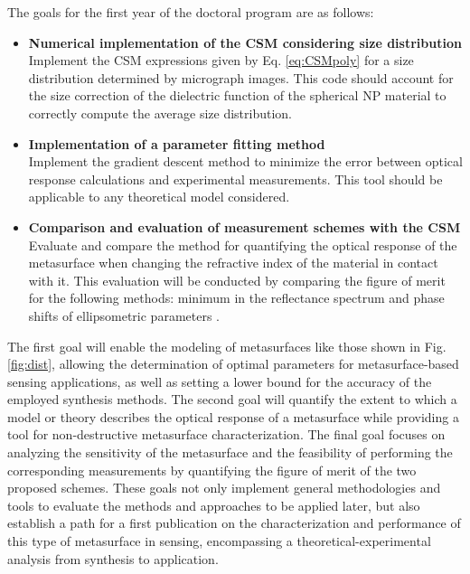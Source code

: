 The goals for the first year of the doctoral program are as follows:
%
\begin{itemize}
	\item \textbf{Numerical implementation of the CSM considering size distribution}\\
	Implement the CSM expressions given by Eq. \eqref{eq:CSMpoly} for a size distribution determined by micrograph images. This code should account for the size correction of the dielectric function \cite{noguez_surface_2007,mendoza_herrera_determination_2014} of the spherical NP material to correctly compute the average size distribution.
	\item \textbf{Implementation of a parameter fitting method}\\
	Implement the gradient descent method \cite{barzilai_two-point_1988} to minimize the error between optical response calculations and experimental measurements. This tool should be applicable to any theoretical model considered.
	\item \textbf{Comparison and evaluation of measurement schemes with the CSM}\\
	Evaluate and compare the method for quantifying the optical response of the metasurface when changing the refractive index of the material in contact with it. This evaluation will be conducted by comparing the figure of merit \cite{estevez_trends_2014} for the following methods: minimum in the reflectance spectrum and phase shifts of ellipsometric parameters \cite{svedendahl_refractometric_2014,qiu_dual_2020}.
\end{itemize}
%
The first goal will enable the modeling of metasurfaces like those shown in Fig. \ref{fig:dist}, allowing the determination of optimal parameters for metasurface-based sensing applications, as well as setting a lower bound for the accuracy of the employed synthesis methods. The second goal will quantify the extent to which a model or theory describes the optical response of a metasurface while providing a tool for non-destructive metasurface characterization. The final goal focuses on analyzing the sensitivity of the metasurface and the feasibility of performing the corresponding measurements by quantifying the figure of merit of the two proposed schemes. These goals not only implement general methodologies and tools to evaluate the methods and approaches to be applied later, but also establish a path for a first publication on the characterization and performance of this type of metasurface in sensing, encompassing a theoretical-experimental analysis from synthesis to application.
